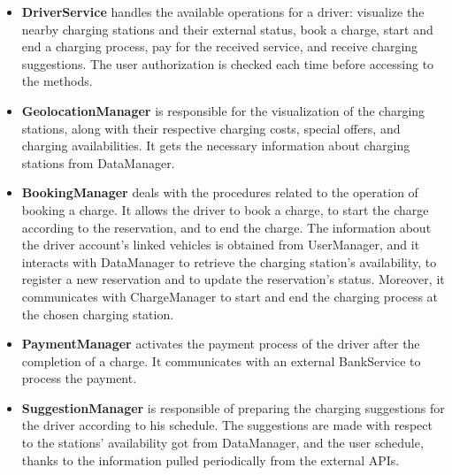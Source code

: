 \documentclass[../main.tex]{subfiles}
\begin{document}
\begin{itemize}
    \item \textbf{DriverService} handles the available operations for a driver: visualize the nearby charging stations and their external status, book a charge, start and end a charging process, pay for the received service, and receive charging suggestions. The user authorization is checked each time before accessing to the methods. 
    \item \textbf{GeolocationManager} is responsible for the visualization of the charging stations, along with their respective charging costs, special offers, and charging availabilities. It gets the necessary information about charging stations from DataManager.
    \item \textbf{BookingManager} deals with the procedures related to the operation of booking a charge. It allows the driver to book a charge, to start the charge according to the reservation, and to end the charge. The information about the driver account's linked vehicles is obtained from UserManager, and it interacts with DataManager to retrieve the charging station's availability, to register a new reservation and to update the reservation's status. Moreover, it communicates with ChargeManager to start and end the charging process at the chosen charging station.
    \item \textbf{PaymentManager} activates the payment process of the driver after the completion of a charge. It communicates with an external BankService to process the payment. 
    \item \textbf{SuggestionManager} is responsible of preparing the charging suggestions for the driver according to his schedule. The suggestions are made with respect to the stations' availability got from DataManager, and the user schedule, thanks to the information pulled periodically from the external APIs.
    

\end{itemize}
\end{document}
